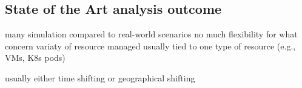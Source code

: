 \subsection{State of the Art analysis outcome}

many simulation compared to real-world scenarios
no much flexibility for what concern variaty of resource managed
usually tied to one type of resource (e.g., VMs, K8s pods)

usually either time shifting or geographical shifting

\newpage
